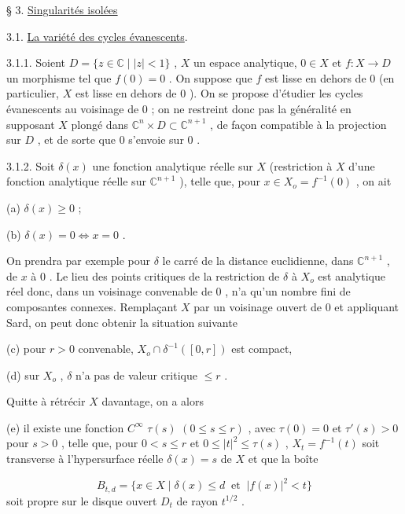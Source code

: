 

§ 3. \underline{Singularités isolées}


3.1. \underline{La variété des cycles évanescents}.

3.1.1. Soient $D = \{z \in \mathbb{C} \mid |z| < 1\}$ , $X$ un espace analytique, $0 \in X$ et $f : X \to D$ un morphisme tel que $f(0) = 0$ . On suppose que $f$ est lisse en dehors de $0$ (en particulier, $X$ est lisse en dehors de $0$ ). On se propose d'étudier les cycles évanescents au voisinage de $0$ ; on ne restreint donc pas la généralité en supposant $X$ plongé dans $\mathbb{C}^n \times D \subset \mathbb{C}^{n+1}$ , de façon compatible à la projection sur $D$ , et de sorte que $0$ s'envoie sur $0$ .

3.1.2. Soit $\delta(x)$ une fonction analytique réelle sur $X$ (restriction à $X$ d'une fonction analytique réelle sur $\mathbb{C}^{n+1}$ ), telle que, pour $x \in X_o = f^{-1}(0)$ , on ait

(a) $\delta(x) \geq 0$ ;

(b) $\delta(x) = 0 \Leftrightarrow x = 0$ .

On prendra par exemple pour $\delta$ le carré de la distance euclidienne, dans $\mathbb{C}^{n+1}$ , de $x$ à $0$ . Le lieu des points critiques de la restriction de $\delta$ à $X_o$ est analytique réel donc, dans un voisinage convenable de $0$ , n'a qu'un nombre fini de composantes connexes. Remplaçant $X$ par un voisinage ouvert de $0$ et appliquant Sard, on peut donc obtenir la situation suivante

(c) pour $r > 0$ convenable, $X_o \cap \delta^{-1}([0, r])$ est compact,

(d) sur $X_o$ , $\delta$ n'a pas de valeur critique $\leq r$ .

Quitte à rétrécir $X$ davantage, on a alors

(e) il existe une fonction $C^\infty$ $\tau(s)$ $(0 \leq s \leq r)$ , avec $\tau(0) = 0$ et $\tau'(s) > 0$ pour $s > 0$ , telle que, pour $0 < s \leq r$ et $0 \leq |t|^2 \leq \tau(s)$ , $X_t = f^{-1}(t)$ soit transverse à l'hypersurface réelle $\delta(x) = s$ de $X$ et que la boîte

\begin{equation*}
B_{t,d} = \{x \in X \mid \delta(x) \leq d \ \text{ et } \ |f(x)|^2 < t\}
\end{equation*}
soit propre sur le disque ouvert $D_t$ de rayon $t^{1/2}$ .



